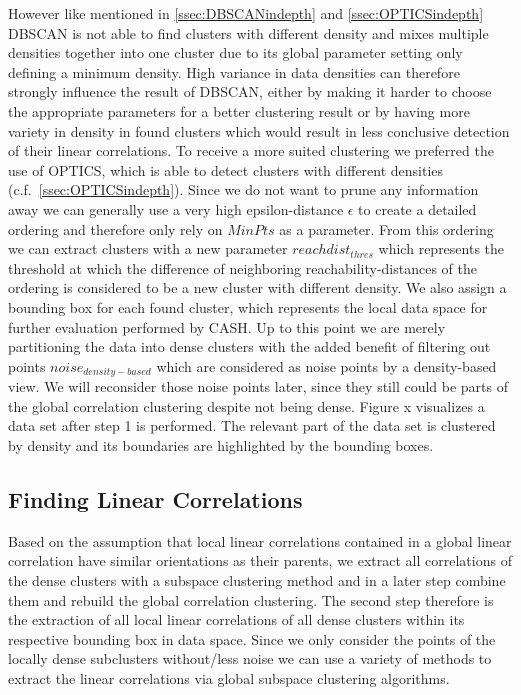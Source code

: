 However like mentioned in \autoref{ssec:DBSCANindepth} and \autoref{ssec:OPTICSindepth} \ac{DBSCAN} is not able to find clusters with different density and mixes multiple densities together into one cluster due to its global parameter setting only defining a minimum density. High variance in data densities can therefore strongly influence the result of \ac{DBSCAN}, either by making it harder to choose the appropriate parameters for a better clustering result or by having more variety in density in found clusters which would result in less conclusive detection of their linear correlations. 
To receive a more suited clustering we preferred the use of \ac{OPTICS}, which is able to detect clusters with different densities (c.f.~\autoref{ssec:OPTICSindepth}). Since we do not want to prune any information away we can generally use a very high epsilon-distance $\epsilon$ to create a detailed ordering and therefore only rely on $MinPts$ as a parameter. From this ordering we can extract clusters with a new parameter $reachdist_{thres}$ which represents the threshold at which the difference of neighboring reachability-distances of the ordering is considered to be a new cluster with different density. We also assign a bounding box for each found cluster, which represents the local data space for further evaluation performed by \ac{CASH}. Up to this point we are merely partitioning the data into dense clusters with the added benefit of filtering out points $noise_{density-based}$ which are considered as noise points by a density-based view. We will reconsider those noise points later, since they still could be parts of the global correlation clustering despite not being dense. Figure x visualizes a data set after step 1 is performed. The relevant part of the data set is clustered by density and its boundaries are highlighted by the bounding boxes.

\subsection{Finding Linear Correlations}
Based on the assumption that local linear correlations contained in a global linear correlation have similar orientations as their parents, we extract all correlations of the dense clusters with a subspace clustering method and in a later step combine them and rebuild the global correlation clustering. The second step therefore is the extraction of all local linear correlations of all dense clusters within its respective bounding box in data space. Since we only consider the points of the locally dense subclusters without/less noise we can use a variety of methods to extract the linear correlations via global subspace clustering algorithms. 

